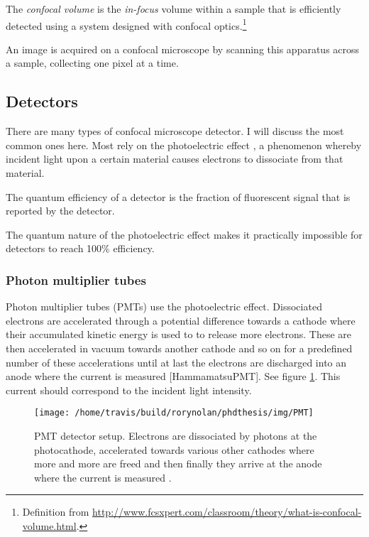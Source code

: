 \documentclass[12pt,]{book}
\let\rmarkdownfootnote\footnote%
\def\footnote{\protect\rmarkdownfootnote}
\theoremstyle{definition}
\theoremstyle{definition}
\theoremstyle{definition}
\theoremstyle{remark}
\let\BeginKnitrBlock\begin \let\EndKnitrBlock\end
\begin{document}
\BeginKnitrBlock{definition}
\protect\hypertarget{def:unnamed-chunk-5}{}{\label{def:unnamed-chunk-5} }The
\emph{confocal volume} is the \emph{in-focus} volume within a sample
that is efficiently detected using a system designed with confocal
optics.\footnote{Definition from
  \url{http://www.fcsxpert.com/classroom/theory/what-is-confocal-volume.html}.}
\EndKnitrBlock{definition}

An image is acquired on a confocal microscope by scanning this apparatus
across a sample, collecting one pixel at a time.

\subsection{Detectors}\label{detectors}

There are many types of confocal microscope detector. I will discuss the
most common ones here. Most rely on the photoelectric effect
\citep{photoelectric}, a phenomenon whereby incident light upon a
certain material causes electrons to dissociate from that material.

\BeginKnitrBlock{definition}
\protect\hypertarget{def:unnamed-chunk-6}{}{\label{def:unnamed-chunk-6} }The
quantum efficiency of a detector is the fraction of fluorescent signal
that is reported by the detector.
\EndKnitrBlock{definition}

The quantum nature of the photoelectric effect makes it practically
impossible for detectors to reach 100\% efficiency.

\subsubsection{Photon multiplier tubes}\label{photon-multiplier-tubes}

Photon multiplier tubes (PMTs) use the photoelectric effect. Dissociated
electrons are accelerated through a potential difference towards a
cathode where their accumulated kinetic energy is used to to release
more electrons. These are then accelerated in vacuum towards another
cathode and so on for a predefined number of these accelerations until
at last the electrons are discharged into an anode where the current is
measured {[}HammamatsuPMT{]}. See figure \ref{fig:PMT}. This current
should correspond to the incident light intensity.






\begin{figure}

\texttt{[image: /home/travis/build/rorynolan/phdthesis/img/PMT]} \hfill{}

\caption{PMT detector setup. Electrons are dissociated by
photons at the photocathode, accelerated towards various other cathodes
where more and more are freed and then finally they arrive at the anode
where the current is measured \citep{LeicaDetectors}.}\label{fig:PMT}
\end{figure}
\end{document}
